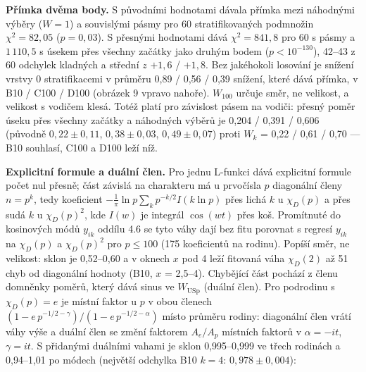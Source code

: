 \documentclass[
  10pt,
]{article}
\begin{document}
\textbf{Přímka dvěma body.} S původními hodnotami dávala přímka mezi
náhodnými výběry (\(W = 1\)) a souvislými pásmy pro 60 stratifikovaných
podmnožin \(\chi^2 = 82{,}05\) (\(p = 0{,}03\)). S přesnými hodnotami
dává \(\chi^2 = 841{,}8\) pro 60 s pásmy a \(1\,110{,}5\) s úsekem přes
všechny začátky jako druhým bodem (\(p < 10^{-130}\)), 42--43 z 60
odchylek kladných a střední \(z\) \(+1{,}6\) / \(+1{,}8\). Bez
jakéhokoli losování je snížení vrstvy 0 stratifikacemi v průměru 0,89 /
0,56 / 0,39 snížení, které dává přímka, v B10 / C100 / D100 (obrázek 9
vpravo nahoře). \(W_{100}\) určuje směr, ne velikost, a velikost s
vodičem klesá. Totéž platí pro závislost pásem na vodiči: přesný poměr
úseku přes všechny začátky a náhodných výběrů je 0,204 / 0,391 / 0,606
(původně \(0{,}22 \pm 0{,}11\), \(0{,}38 \pm 0{,}03\),
\(0{,}49 \pm 0{,}07\)) proti \(W_k\) = 0,22 / 0,61 / 0,70 --- B10
souhlasí, C100 a D100 leží níž.

\textbf{Explicitní formule a duální člen.} Pro jednu L-funkci dává
explicitní formule počet nul přesně; část závislá na charakteru má u
prvočísla \(p\) diagonální členy \(n = p^k\), tedy koeficient
\(-\frac{1}{\pi}\ln p \sum_k p^{-k/2} I(k\ln p)\) přes lichá \(k\) u
\(\chi_D(p)\) a přes sudá \(k\) u \(\chi_D(p)^2\), kde \(I(w)\) je
integrál \(\cos(wt)\) přes koš. Promítnuté do kosinových módů \(y_{ik}\)
oddílu 4.6 se tyto váhy dají bez fitu porovnat s regresí \(y_{ik}\) na
\(\chi_D(p)\) a \(\chi_D(p)^2\) pro \(p \le 100\) (175 koeficientů na
rodinu). Popíší směr, ne velikost: sklon je 0,52--0,60 a v oknech \(x\)
pod 4 leží fitovaná váha \(\chi_D(2)\) až 51 chyb od diagonální hodnoty
(B10, \(x\) = 2,5--4). Chybějící část pochází z členu domněnky poměrů,
který dává sinus ve \(W_{\mathrm{USp}}\) (duální člen). Pro podrodinu s
\(\chi_D(p) = e\) je místní faktor u \(p\) v obou členech
\((1 - e\,p^{-1/2-\gamma})/(1 - e\,p^{-1/2-\alpha})\) místo průměru
rodiny: diagonální člen vrátí váhy výše a duální člen se změní faktorem
\(A_e/A_p\) místních faktorů v \(\alpha = -it\), \(\gamma = it\). S
přidanými duálními vahami je sklon 0,995--0,999 ve třech rodinách a
0,94--1,01 po módech (největší odchylka B10 \(k = 4\):
\(0{,}978 \pm 0{,}004\)):
\end{document}
